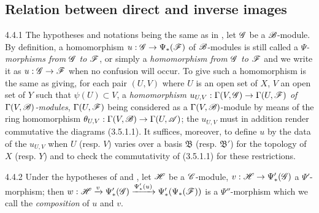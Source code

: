 \subsection{Relation between direct and inverse images}
\label{0-prelim-4.4}

\begin{env}{4.4.1}
\label{env-0.4.4.1}
The hypotheses and notations being the same as in , let
$\mathscr{G}$ be a $\mathscr{B}$-module. By definition, a homomorphism
$u:\mathscr{G}\to\Psi_*(\mathscr{F})$ of $\mathscr{B}$-modules is still called a
\emph{$\Psi$-morphisms from $\mathscr{G}$ to $\mathscr{F}$}, or simply a
\emph{homomorphism from $\mathscr{G}$ to $\mathscr{F}$} and we write it as
$u:\mathscr{G}\to\mathscr{F}$ when no confusion will occur. To give such a homomorphism is
the same as giving, for each pair $(U,V)$ where $U$ is an open set of $X$, $V$
an open set of $Y$ such that $\psi(U)\subset V$, a \emph{homomorphism
$u_{U,V}:\Gamma(V,\mathscr{G})\to\Gamma(U,\mathscr{F})$ of $\Gamma(V,\mathscr{B})$-modules},
$\Gamma(U,\mathscr{F})$ being considered as a $\Gamma(V,\mathscr{B})$-module by means of
the ring homomorphism $\theta_{U,V}:\Gamma(V,\mathscr{B})\to\Gamma(U,\mathscr{A})$; the
$u_{U,V}$ must in addition render commutative the diagrams (3.5.1.1). It
suffices, moreover, to define $u$ by the data of the $u_{U,V}$ when $U$
(resp. $V$) varies over a basis $\mathfrak{B}$ (resp. $\mathfrak{B}'$) for the
topology of $X$ (resp. $Y$) and to check the commutativity of (3.5.1.1) for
these restrictions.
\end{env}

\begin{env}{4.4.2}
\label{env-0.4.4.2}
Under the hypotheses of  and , let $\mathscr{H}$ be
a $\mathscr{C}$-module, $v:\mathscr{H}\to\Psi_*'(\mathscr{G})$ a $\Psi'$-morphism; then
$w:\mathscr{H}\xrightarrow{v}\Psi_*'(\mathscr{G})
  \xrightarrow{\Psi_*'(u)}\Psi_*'(\Psi_*(\mathscr{F}))$ is a $\Psi''$-morphism which
we call the \emph{composition} of $u$ and $v$.
\end{env}

